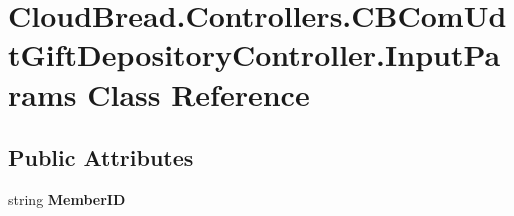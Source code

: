 \hypertarget{a00092}{}\section{Cloud\+Bread.\+Controllers.\+C\+B\+Com\+Udt\+Gift\+Depository\+Controller.\+Input\+Params Class Reference}
\label{a00092}
\subsection*{Public Attributes}
\begin{DoxyCompactItemize}
\item 
string {\bfseries Member\+ID}\hypertarget{a00092_a4e88ae801115ca1db8b86a9d21e63ad1}{}\label{a00092_a4e88ae801115ca1db8b86a9d21e63ad1}

\end{DoxyCompactItemize}
